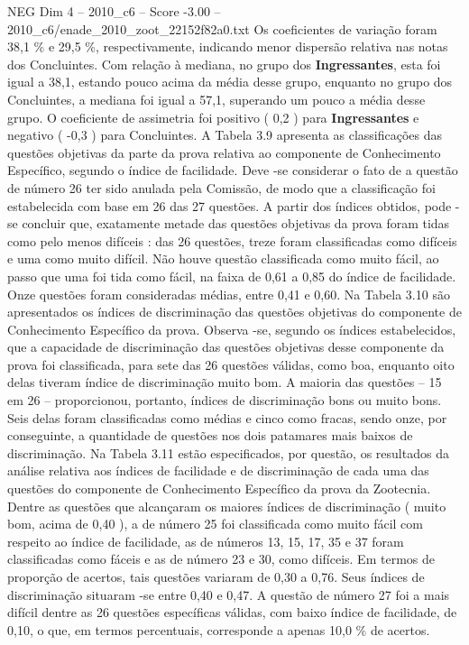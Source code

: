 \begin{textsample}{NEG Dim 4 – 2010\_c6 – Score -3.00 – 2010\_c6/enade\_2010\_zoot\_22152f82a0.txt}
Os coeficientes de variação foram 38,1 \% e 29,5 \%, respectivamente, indicando menor dispersão relativa nas notas dos Concluintes.
Com relação à mediana, no grupo dos \textbf{Ingressantes}, esta foi igual a 38,1, estando pouco acima da média desse grupo, enquanto no grupo dos Concluintes, a mediana foi igual a 57,1, superando um pouco a média desse grupo.
O coeficiente de assimetria foi positivo ( 0,2 ) para \textbf{Ingressantes} e negativo ( -0,3 ) para Concluintes.
A Tabela 3.9 apresenta as classificações das questões objetivas da parte da prova relativa ao componente de Conhecimento Específico, segundo o índice de facilidade.
Deve -se considerar o fato de a questão de número 26 ter sido anulada pela Comissão, de modo que a classificação foi estabelecida com base em 26 das 27 questões.
A partir dos índices obtidos, pode -se concluir que, exatamente metade das questões objetivas da prova foram tidas como pelo menos difíceis : das 26 questões, treze foram classificadas como difíceis e uma como muito difícil.
Não houve questão classificada como muito fácil, ao passo que uma foi tida como fácil, na faixa de 0,61 a 0,85 do índice de facilidade.
Onze questões foram consideradas médias, entre 0,41 e 0,60.
Na Tabela 3.10 são apresentados os índices de discriminação das questões objetivas do componente de Conhecimento Específico da prova.
Observa -se, segundo os índices estabelecidos, que a capacidade de discriminação das questões objetivas desse componente da prova foi classificada, para sete das 26 questões válidas, como boa, enquanto oito delas tiveram índice de discriminação muito bom.
A maioria das questões – 15 em 26 – proporcionou, portanto, índices de discriminação bons ou muito bons.
Seis delas foram classificadas como médias e cinco como fracas, sendo onze, por conseguinte, a quantidade de questões nos dois patamares mais baixos de discriminação.
Na Tabela 3.11 estão especificados, por questão, os resultados da análise relativa aos índices de facilidade e de discriminação de cada uma das questões do componente de Conhecimento Específico da prova da Zootecnia.
Dentre as questões que alcançaram os maiores índices de discriminação ( muito bom, acima de 0,40 ), a de número 25 foi classificada como muito fácil com respeito ao índice de facilidade, as de números 13, 15, 17, 35 e 37 foram classificadas como fáceis e as de número 23 e 30, como difíceis.
Em termos de proporção de acertos, tais questões variaram de 0,30 a 0,76.
Seus índices de discriminação situaram -se entre 0,40 e 0,47.
A questão de número 27 foi a mais difícil dentre as 26 questões específicas válidas, com baixo índice de facilidade, de 0,10, o que, em termos percentuais, corresponde a apenas 10,0 \% de acertos.

\end{textsample}
